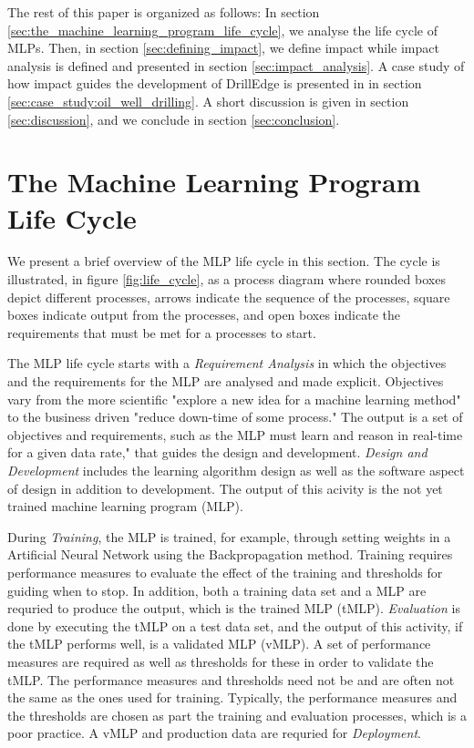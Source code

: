 \documentclass{article}
\theoremstyle{theorem}
\theoremstyle{definition}
\begin{document}
The rest of this paper is organized as follows:
In section \ref{sec:the_machine_learning_program_life_cycle}, we analyse the life cycle of MLPs.
Then, in section \ref{sec:defining_impact}, we define impact while impact analysis is defined and presented in section \ref{sec:impact_analysis}. 
A case study of how impact guides the development of DrillEdge is presented in in section \ref{sec:case_study:oil_well_drilling}.
A short discussion is given in section \ref{sec:discussion}, and we conclude in section \ref{sec:conclusion}.

\section{The Machine Learning Program Life Cycle}
We present a brief overview of the MLP life cycle in this section.
The cycle is illustrated, in figure \ref{fig:life_cycle}, as a process diagram where rounded boxes depict different processes, arrows indicate the sequence of the processes, square boxes indicate output from the processes, and open boxes indicate the requirements that must be met for a processes to start.

The MLP life cycle starts with a \emph{Requirement Analysis} in which the objectives and the requirements for the MLP are analysed and made explicit.
Objectives vary from the more scientific "explore a new idea for a machine learning method" to the business driven "reduce down-time of some process."
The output is a set of objectives and requirements, such as the MLP must learn and reason in real-time for a given data rate," that guides the design and development. 
\emph{Design and Development} includes the learning algorithm design as well as the software aspect of design in addition to development.
The output of this acivity is the not yet trained machine learning program (MLP). 

During \emph{Training}, the MLP is trained, for example, through setting weights in a Artificial Neural Network using the Backpropagation method.
Training requires performance measures to evaluate the effect of the training and thresholds for guiding when to stop.
In addition, both a training data set and a MLP are requried to produce the output, which is the trained MLP (tMLP).
\emph{Evaluation} is done by executing the tMLP on a test data set, and the output of this activity, if the tMLP performs well, is a validated MLP (vMLP). 
A set of performance measures are required as well as thresholds for these in order to validate the tMLP.
The performance measures and thresholds need not be and are often not the same as the ones used for training.
Typically, the performance measures and the thresholds are chosen as part the training and evaluation processes, which is a poor practice.
A vMLP and production data are requried for \emph{Deployment}.
\end{document}
